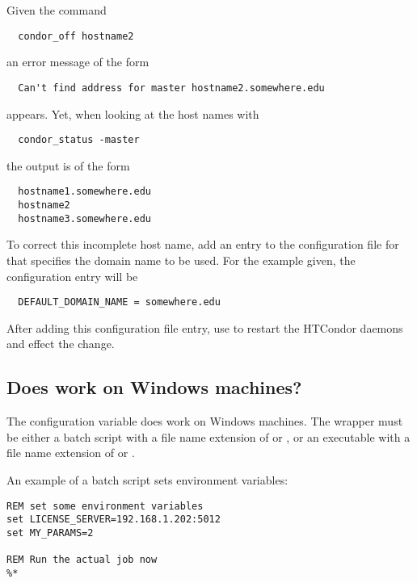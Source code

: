 Given the command
\begin{verbatim}
  condor_off hostname2
\end{verbatim}
an error message of the form
\begin{verbatim}
  Can't find address for master hostname2.somewhere.edu
\end{verbatim}
appears.
Yet, when looking at the host names with
\begin{verbatim}
  condor_status -master
\end{verbatim}
the output is of the form 
\begin{verbatim}
  hostname1.somewhere.edu
  hostname2
  hostname3.somewhere.edu
\end{verbatim}

To correct this incomplete host name, add an entry to the
configuration file for
that specifies the domain name to be used.
For the example given, the configuration entry will be
\begin{verbatim}
  DEFAULT_DOMAIN_NAME = somewhere.edu
\end{verbatim}

After adding this configuration file entry, use 
to restart the HTCondor daemons and effect the change.

%

\subsection*{Does  work on Windows machines?}
The  configuration variable
does work on Windows machines.
The wrapper must be either a
batch script with a file name extension of  or ,
or an
executable with a file name extension of  or .

An example of a batch script sets environment variables:
\footnotesize
\begin{verbatim}
REM set some environment variables
set LICENSE_SERVER=192.168.1.202:5012
set MY_PARAMS=2

REM Run the actual job now
%*
\end{verbatim}
\normalsize


